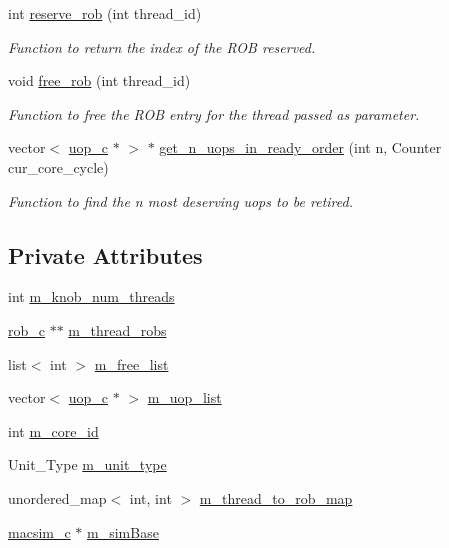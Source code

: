 \begin{DoxyCompactItemize}
int \hyperlink{classsmc__rob__c_a48f8f093a1af607e9c3860804d4fd3f7}{reserve\_\-rob} (int thread\_\-id)
\begin{DoxyCompactList}\small\item\em Function to return the index of the ROB reserved. \item\end{DoxyCompactList}\item 
void \hyperlink{classsmc__rob__c_a16f7c053a3b618b6128ce079ea9636f0}{free\_\-rob} (int thread\_\-id)
\begin{DoxyCompactList}\small\item\em Function to free the ROB entry for the thread passed as parameter. \item\end{DoxyCompactList}\item 
vector$<$ \hyperlink{classuop__c}{uop\_\-c} $\ast$ $>$ $\ast$ \hyperlink{classsmc__rob__c_af76140ffac1f9cbb9de32f7e50618d14}{get\_\-n\_\-uops\_\-in\_\-ready\_\-order} (int n, Counter cur\_\-core\_\-cycle)
\begin{DoxyCompactList}\small\item\em Function to find the n most deserving uops to be retired. \item\end{DoxyCompactList}\end{DoxyCompactItemize}
\subsection*{Private Attributes}
\begin{DoxyCompactItemize}
\item 
int \hyperlink{classsmc__rob__c_a3fe15387db97e2865368976780a54db3}{m\_\-knob\_\-num\_\-threads}
\item 
\hyperlink{classrob__c}{rob\_\-c} $\ast$$\ast$ \hyperlink{classsmc__rob__c_a158a1f5f7421d05352318865b37e92bc}{m\_\-thread\_\-robs}
\item 
list$<$ int $>$ \hyperlink{classsmc__rob__c_a9db8c324e0133f306a0401ad53a52997}{m\_\-free\_\-list}
\item 
vector$<$ \hyperlink{classuop__c}{uop\_\-c} $\ast$ $>$ \hyperlink{classsmc__rob__c_a27d28e046bd5d8fbc76fefb6ad406423}{m\_\-uop\_\-list}
\item 
int \hyperlink{classsmc__rob__c_aad4bb4dd7c9e789a7f5d4d035f072649}{m\_\-core\_\-id}
\item 
Unit\_\-Type \hyperlink{classsmc__rob__c_a5b6e2bf88b64d1f769654120cd9d1f36}{m\_\-unit\_\-type}
\item 
unordered\_\-map$<$ int, int $>$ \hyperlink{classsmc__rob__c_a56ba9b44e042ed8f7cb752c1780ddf2e}{m\_\-thread\_\-to\_\-rob\_\-map}
\item 
\hyperlink{classmacsim__c}{macsim\_\-c} $\ast$ \hyperlink{classsmc__rob__c_a8f735f49a88a96ae31045a882dff660d}{m\_\-simBase}
\end{DoxyCompactItemize}


